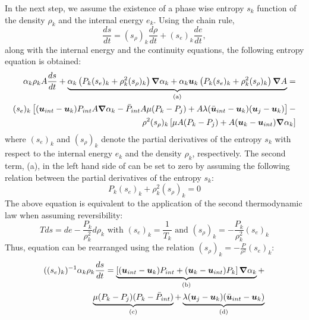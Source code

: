 In the next step, we assume the existence of a phase wise entropy $s_k$ function of the density $\rho_k$ and the internal energy $e_k$. Using the chain rule,
\begin{equation}
\frac{ds}{dt} = (s_\rho)_k \frac{d \rho}{dt} + (s_e)_k \frac{de}{dt},
\end{equation}
along with the internal energy and the continuity equations, the following entropy equation is obtained:
\begin{eqnarray}
\label{eq:ent1}
\alpha_k \rho_k A \frac{ds}{dt} + \underbrace{\alpha_k \left( P_k (s_e)_k + \rho_k^2 (s_\rho)_k \right) \boldsymbol{\nabla} \alpha_k + \alpha_k \boldsymbol u_k \left( P_k (s_e)_k + \rho_k^2 (s_\rho)_k \right) \boldsymbol{\nabla} A}_\textrm{(a)} = \nonumber\\
(s_e)_k \left[ (\boldsymbol u_{int}-\boldsymbol u_k)P_{int}A \boldsymbol{\nabla} \alpha_k - \bar{P}_{int} A \mu (P_k-P_j) + A \lambda (\bar{\boldsymbol u}_{int}-\boldsymbol u_k) (\boldsymbol u_j-\boldsymbol u_k)\right] - \\
\rho^2 (s_\rho)_k \left[ \mu A (P_k-P_j) + A(\boldsymbol u_k-\boldsymbol u_{int}) \boldsymbol{\nabla} \alpha_k\right] \nonumber
\end{eqnarray}
where $(s_e)_k$ and $(s_\rho)_k$ denote the partial derivatives of the entropy $s_k$ with respect to the internal energy $e_k$ and the density $\rho_k$, respectively.
The second term, (a), in the left hand side of  can be set to zero by assuming the following relation between the partial derivatives of the entropy $s_k$:
\begin{equation}
\label{eq:ent2}
 P_k (s_e)_k + \rho_k^2 (s_\rho)_k = 0
\end{equation} 
The above equation is equivalent to the application of the second thermodynamic law when assuming reversibility:
\begin{equation}
T ds = de - \frac{P_k}{\rho_k^2} d \rho_k \text{ with } (s_e)_k = \frac{1}{T_k} \text{ and } (s_\rho)_k = - \frac{P_k}{\rho_k^2} (s_e)_k
\end{equation}
Thus, equation  can be rearranged using the relation $(s_\rho)_k = - \frac{P}{\rho^2} (s_e)_k$:
\begin{eqnarray}
\label{eq:ent3}
((s_e)_k)^{-1} \alpha_k \rho_k \frac{ds}{dt} = \underbrace{\left[ (\boldsymbol u_{int}-\boldsymbol u_k)P_{int} + (\boldsymbol u_k-\boldsymbol u_{int})P_k \right] \boldsymbol{\nabla} \alpha_k}_\textrm{(b)} + \nonumber\\ 
\underbrace{\mu (P_k-P_j)(P_k-\bar{P}_{int})}_\textrm{(c)} + \underbrace{\lambda(\boldsymbol u_j-\boldsymbol u_k)(\bar{\boldsymbol u}_{int}-\boldsymbol u_k)}_\textrm{(d)}
\end{eqnarray}
